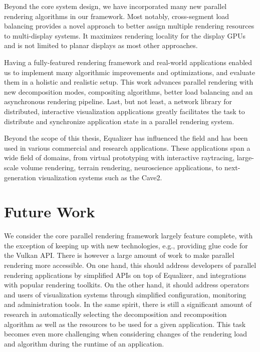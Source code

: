 Beyond the core system design, we have incorporated many new parallel rendering
algorithms in our framework. Most notably, cross-segment load balancing
provides a novel approach to better assign multiple rendering resources to
multi-display systems. It maximizes rendering locality for the display GPUs and
is not limited to planar displays as most other approaches.

Having a fully-featured rendering framework and real-world applications enabled
us to implement many algorithmic improvements and optimizations, and evaluate
them in a holistic and realistic setup. This work advances parallel rendering
with new decomposition modes, compositing algorithms, better load balancing and
an asynchronous rendering pipeline. Last, but not least, a network library for
distributed, interactive visualization applications greatly facilitates the
task to distribute and synchronize application state in a parallel rendering
system.

Beyond the scope of this thesis, Equalizer has influenced the field and has
been used in various commercial and research applications. These applications
span a wide field of domains, from virtual prototyping with interactive
raytracing, large-scale volume rendering, terrain rendering, neuroscience
applications, to next-generation visualization systems such as the Cave2.

\section{Future Work}

We consider the core parallel rendering framework largely feature complete,
with the exception of keeping up with new technologies, e.g., providing glue
code for the Vulkan API. There is however a large amount of work to make
parallel rendering more accessible. On one hand, this should address developers
of parallel rendering applications by simplified APIs on top of Equalizer, and
integrations with popular rendering toolkits. On the other hand, it should
address operators and users of visualization systems through simplified
configuration, monitoring and administration tools. In the same spirit, there
is still a significant amount of research in automatically selecting the
decomposition and recomposition algorithm as well as the resources to be used
for a given application. This task becomes even more challenging when
considering changes of the rendering load and algorithm during the runtime of
an application.

